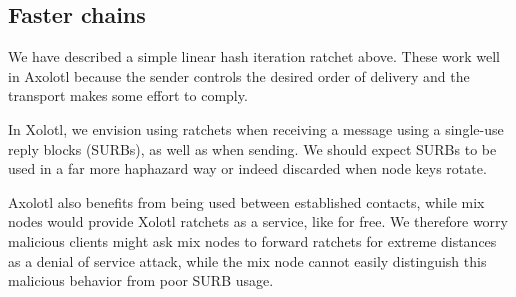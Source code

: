 \documentclass[twoside,letterpaper]{llncs}
\begin{document}
 \begin{figure}[b!]%
   \begin{center}
\end{center}
\end{figure}


\subsection{Faster chains}

We have described a simple linear hash iteration ratchet above.  
These work well in Axolotl because the sender controls the desired
order of delivery and the transport makes some effort to comply.

In Xolotl, we envision using ratchets when receiving a message 
using a single-use reply blocks (SURBs), as well as when sending.
We should expect SURBs to be used in a far more haphazard way or
indeed discarded when node keys rotate.  

Axolotl also benefits from being used between established contacts,
while mix nodes would provide Xolotl ratchets as a service, like
for free.  We therefore worry malicious clients might ask mix nodes
to forward ratchets for extreme distances as a denial of service
attack, while the mix node cannot easily distinguish this malicious
behavior from poor SURB usage.
\end{document}
